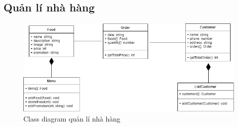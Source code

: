 \newpage
\subsection{Quản lí nhà hàng}
\begin{figure}[!h]
    \begin{center}
        \includegraphics[scale=0.6]{Images/ClassDiagram/management.png}
    \end{center}
    \hspace{0.3cm}
    \caption{Class diagram quản lí nhà hàng}
\end{figure}